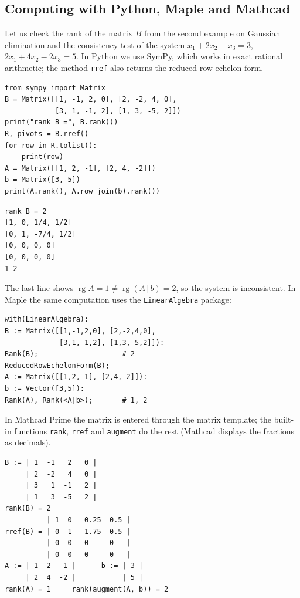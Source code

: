 \subsection{Computing with Python, Maple and Mathcad}
Let us check the rank of the matrix $B$ from the second example on
Gaussian elimination and the consistency test of the system
$x_1+2x_2-x_3=3$, $2x_1+4x_2-2x_3=5$. In Python we use SymPy, which works in
exact rational arithmetic; the method \texttt{rref} also returns the reduced
row echelon form.
\begin{Verbatim}[fontsize=\footnotesize,frame=single,label={\small Python}]
from sympy import Matrix
B = Matrix([[1, -1, 2, 0], [2, -2, 4, 0],
            [3, 1, -1, 2], [1, 3, -5, 2]])
print("rank B =", B.rank())
R, pivots = B.rref()
for row in R.tolist():
    print(row)
A = Matrix([[1, 2, -1], [2, 4, -2]])
b = Matrix([3, 5])
print(A.rank(), A.row_join(b).rank())
\end{Verbatim}
\begin{Verbatim}[fontsize=\footnotesize,frame=single,label={\small Output}]
rank B = 2
[1, 0, 1/4, 1/2]
[0, 1, -7/4, 1/2]
[0, 0, 0, 0]
[0, 0, 0, 0]
1 2
\end{Verbatim}
The last line shows $\operatorname{rg}A=1\neq\operatorname{rg}(A\,|\,b)=2$,
so the system is inconsistent. In Maple the same computation uses the
\texttt{LinearAlgebra} package:
\begin{Verbatim}[fontsize=\footnotesize,frame=single,label={\small Maple}]
with(LinearAlgebra):
B := Matrix([[1,-1,2,0], [2,-2,4,0],
             [3,1,-1,2], [1,3,-5,2]]):
Rank(B);                    # 2
ReducedRowEchelonForm(B);
A := Matrix([[1,2,-1], [2,4,-2]]):
b := Vector([3,5]):
Rank(A), Rank(<A|b>);       # 1, 2
\end{Verbatim}
In Mathcad Prime the matrix is entered through the matrix template; the
built-in functions \texttt{rank}, \texttt{rref} and \texttt{augment} do the
rest (Mathcad displays the fractions as decimals).
\begin{Verbatim}[fontsize=\footnotesize,frame=single,label={\small Mathcad}]
B := | 1  -1   2   0 |
     | 2  -2   4   0 |
     | 3   1  -1   2 |
     | 1   3  -5   2 |
rank(B) = 2
          | 1  0   0.25  0.5 |
rref(B) = | 0  1  -1.75  0.5 |
          | 0  0   0     0   |
          | 0  0   0     0   |
A := | 1  2  -1 |      b := | 3 |
     | 2  4  -2 |           | 5 |
rank(A) = 1     rank(augment(A, b)) = 2
\end{Verbatim}

